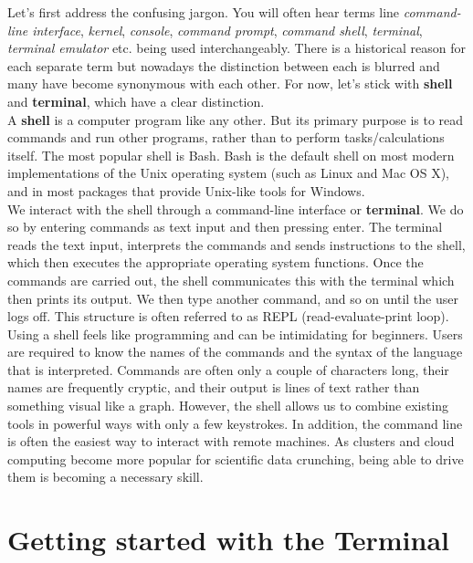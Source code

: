 \documentclass{article}
\begin{document}
Let's first address the confusing jargon. You will often hear terms line \emph{command-line interface}, \emph{kernel}, \emph{console}, \emph{command prompt}, \emph{command shell}, \emph{terminal}, \emph{terminal emulator} etc. being used interchangeably. There is a historical reason for each separate term but nowadays the distinction between each is blurred and many have become synonymous with each other. For now, let's stick with \textbf{shell} and \textbf{terminal}, which have a clear distinction.\\

A \textbf{shell} is a computer program like any other. But its primary purpose is to read commands and run other programs, rather than to perform tasks/calculations itself. The most popular shell is Bash. Bash is the default shell on most modern implementations of the Unix operating system (such as Linux and Mac OS X), and in most packages that provide Unix-like tools for Windows.\\

We interact with the shell through a command-line interface or \textbf{terminal}. We do so by entering commands as text input and then pressing enter. The terminal reads the text input, interprets the commands and sends instructions to the shell, which then executes the appropriate operating system functions. Once the commands are carried out, the shell communicates this with the terminal which then prints its output. We then type another command, and so on until the user logs off. This structure is often referred to as REPL (read-evaluate-print loop).\\

Using a shell feels like programming and can be intimidating for beginners. Users are required to know the names of the commands and the syntax of the language that is interpreted. Commands are often only a couple of characters long, their names are frequently cryptic, and their output is lines of text rather than something visual like a graph. However, the shell allows us to combine existing tools in powerful ways with only a few keystrokes. In addition, the command line is often the easiest way to interact with remote machines. As clusters and cloud computing become more popular for scientific data crunching, being able to drive them is becoming a necessary skill.


\newpage
\section{Getting started with the Terminal}
\end{document}
